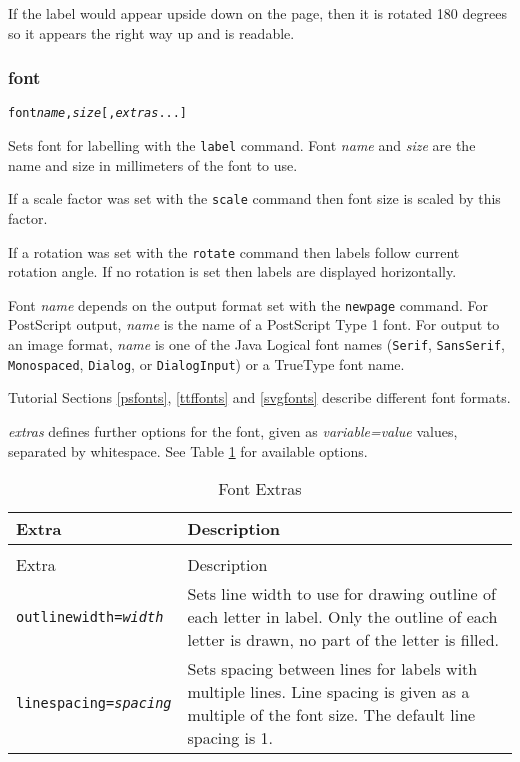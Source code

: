 If the label would appear upside down on the page, then it is rotated
180 degrees so it appears the right way up and is readable.

\subsubsection{font}

\begin{alltt}
font \textit{name}, \textit{size} [, \textit{extras} ...]
\end{alltt}

Sets font for labelling with the \texttt{label} command.
Font \textit{name} and \textit{size} are the name and size in
millimeters of the font to use.

If a scale factor was set with the
\texttt{scale} command
then font size is scaled by this factor.

If a rotation was set with the
\texttt{rotate} command
then labels follow current rotation angle.
If no rotation is set then labels are displayed
horizontally.

Font \textit{name}
depends on the output format set with the
\texttt{newpage} command.
For PostScript output, \textit{name} is the name of a PostScript Type 1
font.
For output to an image format, \textit{name} is one of the Java Logical
font names (\texttt{Serif}, \texttt{SansSerif},
\texttt{Monospaced}, \texttt{Dialog}, or \texttt{DialogInput}) or a TrueType
font name.

Tutorial Sections \ref{psfonts}, \ref{ttffonts} and \ref{svgfonts}
describe different font formats.

\textit{extras} defines further options for the font, given as
\textit{variable=value} values, separated by whitespace.
See Table \ref{fontextras}
for available options.

\begin{longtable}{|l|p{7cm}|}
\hline
\label{fontextras}
Extra & Description \\
\hline
\hline
\endfirsthead
\hline
\caption{Font Extras} \\
\endfoot

\hline
Extra & Description \\
\hline
\hline
\endhead

\texttt{outlinewidth=\textit{width}} &

Sets line width to use for drawing outline of each letter in label.
Only the outline of each letter is drawn, no part of the letter is filled. \\

\texttt{linespacing=\textit{spacing}} &

Sets spacing between lines for labels with multiple lines.
Line spacing is given as a multiple of the font size.
The default line spacing is 1. \\

\hline
\end{longtable}

